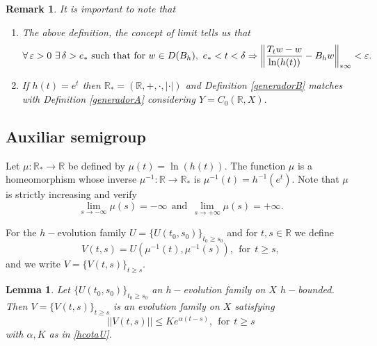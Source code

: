 \documentclass[10pt]{amsart}
\newtheorem{lemma}{Lemma}
\numberwithin{equation}{section}
\newtheorem{Remark}{Remark}
\begin{document}
\begin{Remark}  It is important to note that
\begin{enumerate}
    \item The above definition, the concept of limit tells us that
\begin{displaymath}
\forall \, \varepsilon > 0 \,\, \exists \, \delta > e_* \ \textnormal{such that for} \ w \in D(B_h), \ 
e_* < t < \delta \Rightarrow \left\|\frac{T_t w - w}{\ln(h(t))} - B_hw \right\|_{*\infty}<\varepsilon.
\end{displaymath}


\item If $h(t) = e^t$ then $\mathbb{R}_* = (\mathbb{R}, +, \cdot, |\cdot|)$ and Definition \ref{generadorB} matches with Definition \ref{generadorA} considering $Y = C_0(\mathbb{R}, X).$
\end{enumerate}
\end{Remark}




\subsection{Auxiliar semigroup}

Let $\mu: \mathbb{R}_* \to \mathbb{R}$ be defined by $\mu(t) = \ln(h(t)).$ The function $\mu$ is a homeomorphism whose inverse $\mu^{-1}: \mathbb{R} \to \mathbb{R}_*$ is $\mu^{-1}(t) = h^{-1}(e^t).$ Note that $\mu$ is strictly increasing and verify
\begin{equation}\label{liminf}
    \lim_{s \to -\infty} \mu(s) = -\infty \ \ \mbox{and} \ \  \lim_{s \to +\infty} \mu(s) = +\infty.
\end{equation}

For the $h-$evolution family $U = \{U(t_0,s_0)\}_{t_0\ge s_0}$ and for $t,s \in \mathbb{R}$ we define
\begin{equation}\label{DefV}
V(t,s) = U(\mu^{-1}(t), \mu^{-1} (s)), \ \ \mbox{for} \ \ t \ge s,
\end{equation}
and we write $V = \{V(t,s)\}_{t \ge s}.$



\begin{lemma}\label{VexpAcot}
Let $\{U(t_0,s_0)\}_{t_0\ge s_0}$ an $h-$evolution family on $X$ $h-$bounded. Then 
$V = \{V(t,s)\}_{t\ge s}$ is an evolution family on $X$ satisfying 
$$
||V(t,s)|| \le K e^{\alpha(t-s)},   \ \ \mbox{for} \ \ t \ge s
$$
with $\alpha, K$ as in \eqref{hcotaU}.
\end{lemma}
\end{document}
